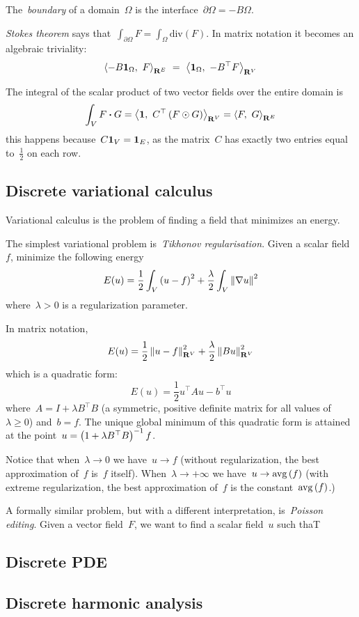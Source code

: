 The~\emph{boundary} of a domain~$\Omega$ is the
interface~$\partial\Omega=-B\Omega$.

\emph{Stokes theorem} says
that~$\int_{\partial\Omega}F=\int_\Omega\mathrm{div}\left(F\right)$.
In matrix notation it becomes an algebraic triviality:
\[
	 \left\langle-B\1_\Omega,\ F\right\rangle_{\R^E}
	 \ =\ %
	 \left\langle\1_\Omega,\ -B^\top F\right\rangle_{\R^V}
\]

The integral of the scalar product of two vector fields over the entire
domain is
\[
	\int_V F\boldsymbol{\cdot}G
	=
	\left\langle\mathbf{1},\ C^\top\left(F\odot G\right)\right\rangle_{\mathbf{R}^V}
	=
	\left\langle F,\ G\right\rangle_{\mathbf{R}^E}
\]
this happens because~$C\mathbf{1}_V=\mathbf{1}_E$, as the matrix~$C$ has exactly two entries
equal to~$\frac12$ on each row.

\clearpage
\subsection{Discrete variational calculus}

Variational calculus is the problem of finding a field that minimizes an
energy.

The simplest variational problem is~\emph{Tikhonov regularisation}.  Given a
scalar field~$f$, minimize the following energy
\[
	E(u)=\frac12\int_V \left(u-f\right)^2+\frac\lambda2\int_V \left\|\nabla u\right\|^2
\]
where~$\lambda>0$ is a regularization parameter.

In matrix notation,
\[
	E(u)=\frac12\left\|u-f\right\|^2_{\mathbf{R}^V}+\frac\lambda2\left\|Bu\right\|^2_{\mathbf{R}^V}
\]
which is a quadratic form:
\[
	E(u)=\frac12 u^\top Au-b^\top u
\]
where~$A=I+\lambda B^\top B$ (a symmetric, positive definite matrix for all
values of~$\lambda\ge0$) and~$b=f$.  The unique global minimum of this
quadratic form is attained at the point~$u=\left(1+\lambda B^\top
B\right)^{-1}f$.

Notice that when~$\lambda\to 0$ we have~$u\to f$ (without regularization, the
best approximation of~$f$ is~$f$ itself).  When~$\lambda\to+\infty$ we
have~$u\to\mathrm{avg}\left(f\right)$ (with extreme regularization, the best
approximation of~$f$ is the constant~$\mathrm{avg}\left(f\right)$.)

A formally similar problem, but with a different interpretation,
is~\emph{Poisson editing}.  Given a vector field~$F$, we want to find
a scalar field~$u$ such thaT

\clearpage
\subsection{Discrete PDE}

\clearpage
\subsection{Discrete harmonic analysis}



